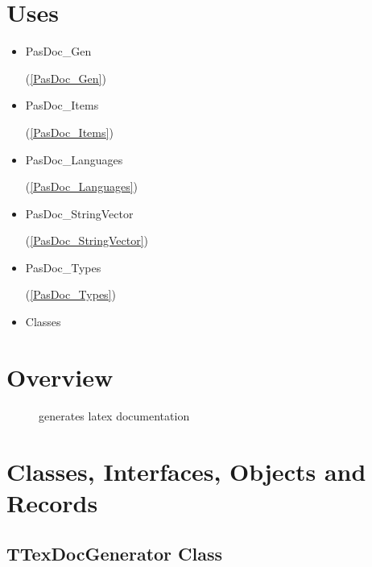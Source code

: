 \documentclass{report}
\newif\ifpdf
\begin{document}
\section{Uses}
\begin{itemize}
\item \begin{ttfamily}PasDoc{\_}Gen\end{ttfamily}(\ref{PasDoc_Gen})\item \begin{ttfamily}PasDoc{\_}Items\end{ttfamily}(\ref{PasDoc_Items})\item \begin{ttfamily}PasDoc{\_}Languages\end{ttfamily}(\ref{PasDoc_Languages})\item \begin{ttfamily}PasDoc{\_}StringVector\end{ttfamily}(\ref{PasDoc_StringVector})\item \begin{ttfamily}PasDoc{\_}Types\end{ttfamily}(\ref{PasDoc_Types})\item \begin{ttfamily}Classes\end{ttfamily}\end{itemize}
\section{Overview}
\begin{description}
\item[\texttt{\begin{ttfamily}TTexDocGenerator\end{ttfamily} Class}]generates latex documentation
\end{description}
\section{Classes, Interfaces, Objects and Records}
\ifpdf
\subsection*{\large{\textbf{TTexDocGenerator Class}}\normalsize\hspace{1ex}\hrulefill}
\else
\subsection*{TTexDocGenerator Class}
\fi
\label{PasDoc_GenLatex.TTexDocGenerator}
\end{document}
